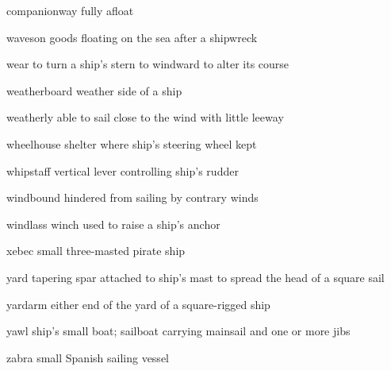 \documentclass[
  11pt,
  msmallroyalvopaper
]{memoir}
\begin{document}
\begin{labeling}{companionway}
fully afloat
\item[waveson]
goods floating on the sea after a shipwreck
\item[wear]
to turn a ship's stern to windward to alter its course
\item[weatherboard]
weather side of a ship
\item[weatherly]
able to sail close to the wind with little leeway
\item[wheelhouse]
shelter where ship's steering wheel kept
\item[whipstaff]
vertical lever controlling ship's rudder
\item[windbound]
hindered from sailing by contrary winds
\item[windlass]
winch used to raise a ship's anchor
\item[xebec]
small three-masted pirate ship
\item[yard]
tapering spar attached to ship's mast to spread the head of a square
sail
\item[yardarm]
either end of the yard of a square-rigged ship
\item[yawl]
ship's small boat; sailboat carrying mainsail and one or more jibs
\item[zabra]
small Spanish sailing vessel
\end{labeling}
\end{document}
